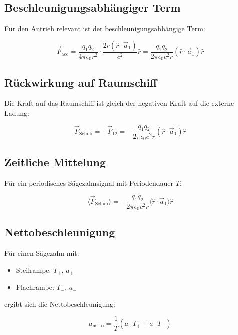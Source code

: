\documentclass[11pt, a4paper]{article}
\begin{document}
\subsection{Beschleunigungsabhängiger Term}

Für den Antrieb relevant ist der beschleunigungsabhängige Term:

\begin{equation}
\vec{F}_{\text{acc}} = \frac{q_1 q_2}{4\pi\epsilon_0 r^2} \cdot \frac{2r (\hat{r} \cdot \vec{a}_1)}{c^2} \hat{r}
= \frac{q_1 q_2}{2\pi\epsilon_0 c^2 r} (\hat{r} \cdot \vec{a}_1) \hat{r}
\end{equation}

\subsection{Rückwirkung auf Raumschiff}

Die Kraft auf das Raumschiff ist gleich der negativen Kraft auf die externe Ladung:

\begin{equation}
\vec{F}_{\text{Schub}} = -\vec{F}_{12} = -\frac{q_1 q_2}{2\pi\epsilon_0 c^2 r} (\hat{r} \cdot \vec{a}_1) \hat{r}
\end{equation}

\subsection{Zeitliche Mittelung}

Für ein periodisches Sägezahnsignal mit Periodendauer $T$:

\begin{equation}
\langle \vec{F}_{\text{Schub}} \rangle = -\frac{q_1 q_2}{2\pi\epsilon_0 c^2 r} \langle \hat{r} \cdot \vec{a}_1 \rangle \hat{r}
\end{equation}

\subsection{Nettobeschleunigung}

Für einen Sägezahn mit:
\begin{itemize}
    \item Steilrampe: $T_+$, $a_+$
    \item Flachrampe: $T_-$, $a_-$
\end{itemize}

ergibt sich die Nettobeschleunigung:

\begin{equation}
a_{\text{netto}} = \frac{1}{T} (a_+ T_+ + a_- T_-)
\end{equation}
\end{document}
